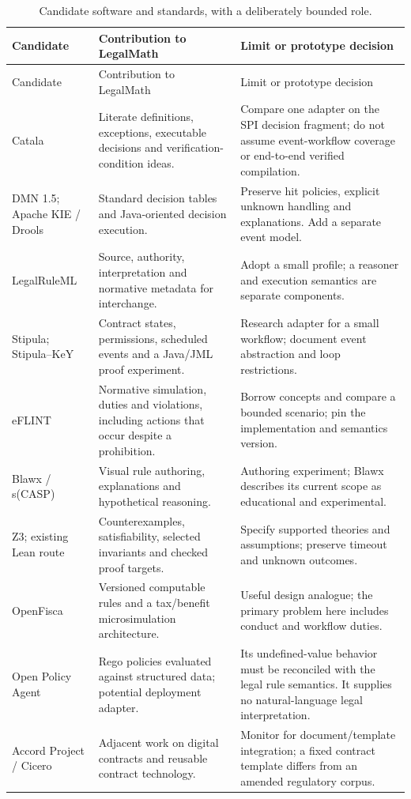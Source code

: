 \begingroup\small
\begin{longtable}{P{0.19\textwidth}P{0.37\textwidth}P{0.34\textwidth}}
\caption{Candidate software and standards, with a deliberately bounded role.}
\label{tab:software}\\
\toprule Candidate & Contribution to LegalMath & Limit or prototype decision \\\midrule
\endfirsthead
\toprule Candidate & Contribution to LegalMath & Limit or prototype decision \\\midrule
\endhead
Catala & Literate definitions, exceptions, executable decisions and verification-condition ideas. & Compare one adapter on the SPI decision fragment; do not assume event-workflow coverage or end-to-end verified compilation. \citep{catalacode}\\
DMN 1.5; Apache KIE / Drools & Standard decision tables and Java-oriented decision execution. & Preserve hit policies, explicit unknown handling and explanations. Add a separate event model. \citep{dmn2024,droolscode}\\
LegalRuleML & Source, authority, interpretation and normative metadata for interchange. & Adopt a small profile; a reasoner and execution semantics are separate components. \citep{legalruleml2021}\\
Stipula; Stipula--KeY & Contract states, permissions, scheduled events and a Java/JML proof experiment. & Research adapter for a small workflow; document event abstraction and loop restrictions. \citep{stipulacode,stipulakeycode}\\
eFLINT & Normative simulation, duties and violations, including actions that occur despite a prohibition. & Borrow concepts and compare a bounded scenario; pin the implementation and semantics version. \citep{eflint2026}\\
Blawx / s(CASP) & Visual rule authoring, explanations and hypothetical reasoning. & Authoring experiment; Blawx describes its current scope as educational and experimental. \citep{blawxcode,slaw2024}\\
Z3; existing Lean route & Counterexamples, satisfiability, selected invariants and checked proof targets. & Specify supported theories and assumptions; preserve timeout and unknown outcomes. \citep{z3code,localrepos}\\
OpenFisca & Versioned computable rules and a tax/benefit microsimulation architecture. & Useful design analogue; the primary problem here includes conduct and workflow duties. \citep{openfiscacode}\\
Open Policy Agent & Rego policies evaluated against structured data; potential deployment adapter. & Its undefined-value behavior must be reconciled with the legal rule semantics. It supplies no natural-language legal interpretation. \citep{opadocs}\\
Accord Project / Cicero & Adjacent work on digital contracts and reusable contract technology. & Monitor for document/template integration; a fixed contract template differs from an amended regulatory corpus. \citep{cicerocode}\\
\bottomrule
\end{longtable}
\endgroup

